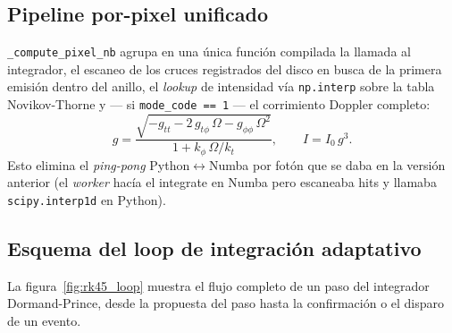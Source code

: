\documentclass[11pt,a4paper]{article}
\begin{document}
\subsection{Pipeline por-pixel unificado}

\texttt{\_compute\_pixel\_nb} agrupa en una única función compilada la
llamada al integrador, el escaneo de los cruces registrados del disco
en busca de la primera emisión dentro del anillo, el \emph{lookup} de
intensidad vía \texttt{np.interp} sobre la tabla Novikov-Thorne y
--- si \verb|mode_code == 1| --- el corrimiento Doppler completo:
\[
g = \frac{\sqrt{-g_{tt} - 2\,g_{t\phi}\,\Omega - g_{\phi\phi}\,\Omega^{2}}}
        {1 + k_{\phi}\,\Omega / k_{t}},\qquad
I = I_{0}\,g^{3}.
\]
Esto elimina el \emph{ping-pong} Python$\leftrightarrow$Numba por fotón
que se daba en la versión anterior (el \emph{worker} hacía el integrate
en Numba pero escaneaba hits y llamaba \texttt{scipy.interp1d} en Python).

\subsection{Esquema del loop de integración adaptativo}
\label{sec:loop}

La figura~\ref{fig:rk45_loop} muestra el flujo completo de un paso del
integrador Dormand-Prince, desde la propuesta del paso hasta la
confirmación o el disparo de un evento.
\end{document}
